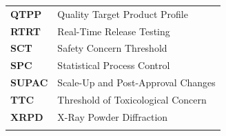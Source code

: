\documentclass[
  11pt,
  a4paper,
]{report}
\begin{document}
\begin{longtable}[]{@{}ll@{}}
\begin{minipage}[t]{0.33\columnwidth}\raggedright
\textbf{QTPP}\strut
\end{minipage} & \begin{minipage}[t]{0.61\columnwidth}\raggedright
Quality Target Product Profile\strut
\end{minipage}\tabularnewline
\begin{minipage}[t]{0.33\columnwidth}\raggedright
\textbf{RTRT}\strut
\end{minipage} & \begin{minipage}[t]{0.61\columnwidth}\raggedright
Real-Time Release Testing\strut
\end{minipage}\tabularnewline
\begin{minipage}[t]{0.33\columnwidth}\raggedright
\textbf{SCT}\strut
\end{minipage} & \begin{minipage}[t]{0.61\columnwidth}\raggedright
Safety Concern Threshold\strut
\end{minipage}\tabularnewline
\begin{minipage}[t]{0.33\columnwidth}\raggedright
\textbf{SPC}\strut
\end{minipage} & \begin{minipage}[t]{0.61\columnwidth}\raggedright
Statistical Process Control\strut
\end{minipage}\tabularnewline
\begin{minipage}[t]{0.33\columnwidth}\raggedright
\textbf{SUPAC}\strut
\end{minipage} & \begin{minipage}[t]{0.61\columnwidth}\raggedright
Scale-Up and Post-Approval Changes\strut
\end{minipage}\tabularnewline
\begin{minipage}[t]{0.33\columnwidth}\raggedright
\textbf{TTC}\strut
\end{minipage} & \begin{minipage}[t]{0.61\columnwidth}\raggedright
Threshold of Toxicological Concern\strut
\end{minipage}\tabularnewline
\begin{minipage}[t]{0.33\columnwidth}\raggedright
\textbf{XRPD}\strut
\end{minipage} & \begin{minipage}[t]{0.61\columnwidth}\raggedright
X-Ray Powder Diffraction\strut
\end{minipage}\tabularnewline
\begin{minipage}[t]{0.33\columnwidth}\raggedright

\end{minipage}
\end{longtable}
\end{document}
